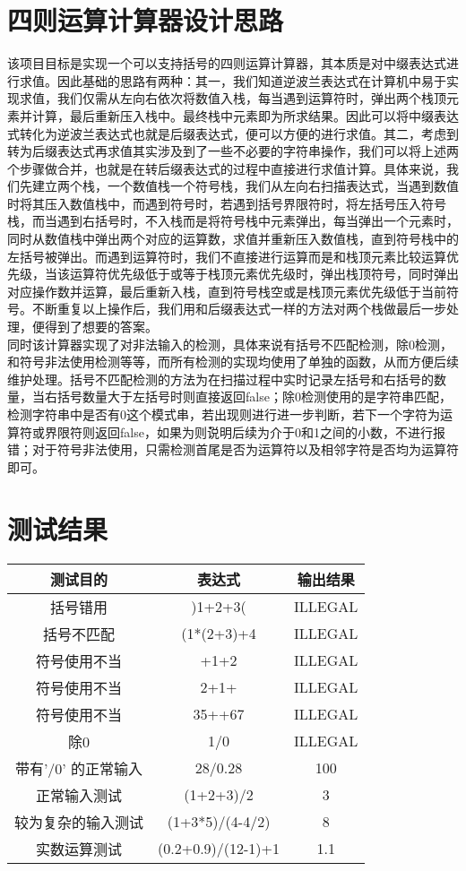 \documentclass[UTF8]{ctexart}
\begin{document}
\pagestyle{fancy}
\fancyhead{}

\section{四则运算计算器设计思路}
\indent 该项目目标是实现一个可以支持括号的四则运算计算器，其本质是对中缀表达式进行求值。因此基础的思路有两种：其一，我们知道逆波兰表达式在计算机中易于实现求值，我们仅需从左向右依次将数值入栈，每当遇到运算符时，弹出两个栈顶元素并计算，最后重新压入栈中。最终栈中元素即为所求结果。因此可以将中缀表达式转化为逆波兰表达式也就是后缀表达式，便可以方便的进行求值。其二，考虑到转为后缀表达式再求值其实涉及到了一些不必要的字符串操作，我们可以将上述两个步骤做合并，也就是在转后缀表达式的过程中直接进行求值计算。具体来说，我们先建立两个栈，一个数值栈一个符号栈，我们从左向右扫描表达式，当遇到数值时将其压入数值栈中，而遇到符号时，若遇到括号界限符时，将左括号压入符号栈，而当遇到右括号时，不入栈而是将符号栈中元素弹出，每当弹出一个元素时，同时从数值栈中弹出两个对应的运算数，求值并重新压入数值栈，直到符号栈中的左括号被弹出。而遇到运算符时，我们不直接进行运算而是和栈顶元素比较运算优先级，当该运算符优先级低于或等于栈顶元素优先级时，弹出栈顶符号，同时弹出对应操作数并运算，最后重新入栈，直到符号栈空或是栈顶元素优先级低于当前符号。不断重复以上操作后，我们用和后缀表达式一样的方法对两个栈做最后一步处理，便得到了想要的答案。\\
\indent 同时该计算器实现了对非法输入的检测，具体来说有括号不匹配检测，除0检测，和符号非法使用检测等等，而所有检测的实现均使用了单独的函数，从而方便后续维护处理。括号不匹配检测的方法为在扫描过程中实时记录左括号和右括号的数量，当右括号数量大于左括号时则直接返回false；除0检测使用的是字符串匹配，检测字符串中是否有\/0这个模式串，若出现则进行进一步判断，若下一个字符为运算符或界限符则返回false，如果为\.则说明后续为介于0和1之间的小数，不进行报错；对于符号非法使用，只需检测首尾是否为运算符以及相邻字符是否均为运算符即可。

\section{测试结果}
\begin{center}
\begin{tabular}{|c|c|c|}
\hline
测试目的 & 表达式 & 输出结果 \\
\hline
括号错用 & )1+2+3( & ILLEGAL \\
\hline
括号不匹配 & (1*(2+3)+4 & ILLEGAL \\
\hline
符号使用不当 & +1+2 & ILLEGAL \\
\hline
符号使用不当 & 2+1+ & ILLEGAL \\
\hline
符号使用不当 & 35++67 & ILLEGAL \\
\hline
除0 & 1/0 & ILLEGAL \\
\hline
带有'/0' 的正常输入 & 28/0.28 & 100 \\
\hline
正常输入测试 & (1+2+3)/2 & 3 \\
\hline
较为复杂的输入测试 & (1+3*5)/(4-4/2) & 8 \\
\hline
实数运算测试 & (0.2+0.9)/(12-1)+1 & 1.1 \\
\hline
\end{tabular}
\end{center}
\end{document}

